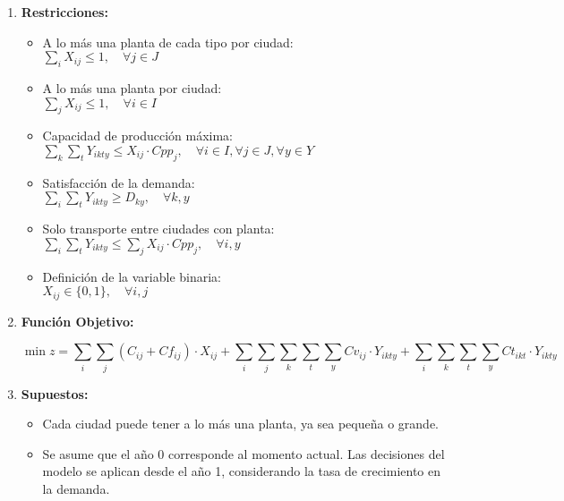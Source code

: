\documentclass[a4paper]{article}
\begin{document}
\begin{enumerate}
        \item \textbf{Restricciones:}
        \begin{itemize}
            \item A lo m\'as una planta de cada tipo por ciudad: \\ $\sum_{i} X_{ij} \leq 1, \quad \forall j \in J$
            \item A lo m\'as una planta por ciudad: \\ $\sum_{j} X_{ij} \leq 1, \quad \forall i \in I$
            \item Capacidad de producci\'on m\'axima: \\ $\sum_{k} \sum_{t} Y_{ikty} \leq X_{ij} \cdot Cpp_{j}, \quad \forall i \in I, \forall j \in J, \forall y \in Y$
            \item Satisfacci\'on de la demanda: \\ $\sum_{i} \sum_{t} Y_{ikty} \geq D_{ky}, \quad \forall k, y$
            \item Solo transporte entre ciudades con planta: \\ $\sum_{i} \sum_{t} Y_{ikty} \leq \sum_{j} X_{ij} \cdot Cpp_{j}, \quad \forall i, y$
            \item Definici\'on de la variable binaria: \\ $X_{ij} \in \{0,1\}, \quad \forall i, j$
        \end{itemize}

        
        \item \textbf{Funci\'on Objetivo:}
        
        \begin{equation*}
            \min 
                z = \sum_{i} \sum_{j} (C_{ij} + Cf_{ij}) \cdot X_{ij} 
                + \sum_{i} \sum_{j} \sum_{k} \sum_{t} \sum_{y} Cv_{ij} \cdot Y_{ikty} 
                + \sum_{i} \sum_{k} \sum_{t} \sum_{y} Ct_{ikt} \cdot Y_{ikty}
     
        \end{equation*}
        
        \item \textbf{Supuestos:}
        \begin{itemize}
            \item Cada ciudad puede tener a lo m\'as una planta, ya sea peque\~na o grande.
            \item Se asume que el a\~no 0 corresponde al momento actual. Las decisiones del modelo se aplican desde el a\~no 1, considerando la tasa de crecimiento en la demanda.
        \end{itemize}
    \end{enumerate}
\end{document}

